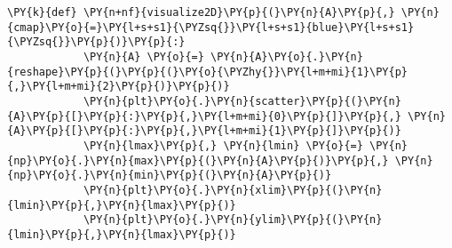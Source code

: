 \begin{Verbatim}[commandchars=\\\{\}]
        \PY{k}{def} \PY{n+nf}{visualize2D}\PY{p}{(}\PY{n}{A}\PY{p}{,} \PY{n}{cmap}\PY{o}{=}\PY{l+s+s1}{\PYZsq{}}\PY{l+s+s1}{blue}\PY{l+s+s1}{\PYZsq{}}\PY{p}{)}\PY{p}{:}
            \PY{n}{A} \PY{o}{=} \PY{n}{A}\PY{o}{.}\PY{n}{reshape}\PY{p}{(}\PY{p}{(}\PY{o}{\PYZhy{}}\PY{l+m+mi}{1}\PY{p}{,}\PY{l+m+mi}{2}\PY{p}{)}\PY{p}{)}
            \PY{n}{plt}\PY{o}{.}\PY{n}{scatter}\PY{p}{(}\PY{n}{A}\PY{p}{[}\PY{p}{:}\PY{p}{,}\PY{l+m+mi}{0}\PY{p}{]}\PY{p}{,} \PY{n}{A}\PY{p}{[}\PY{p}{:}\PY{p}{,}\PY{l+m+mi}{1}\PY{p}{]}\PY{p}{)}
            \PY{n}{lmax}\PY{p}{,} \PY{n}{lmin} \PY{o}{=} \PY{n}{np}\PY{o}{.}\PY{n}{max}\PY{p}{(}\PY{n}{A}\PY{p}{)}\PY{p}{,} \PY{n}{np}\PY{o}{.}\PY{n}{min}\PY{p}{(}\PY{n}{A}\PY{p}{)}
            \PY{n}{plt}\PY{o}{.}\PY{n}{xlim}\PY{p}{(}\PY{n}{lmin}\PY{p}{,}\PY{n}{lmax}\PY{p}{)}
            \PY{n}{plt}\PY{o}{.}\PY{n}{ylim}\PY{p}{(}\PY{n}{lmin}\PY{p}{,}\PY{n}{lmax}\PY{p}{)}
\end{Verbatim}

